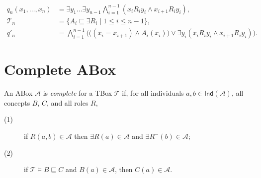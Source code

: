\documentclass{article}
\begin{document}
\begin{align*}
q_n(x_1, \ldots, x_n) &= \exists y_1 \ldots \exists y_{n-1} \bigwedge_{i=1}^{n-1} (x_i R_i y_i \land x_{i+1} R_i y_i),\\
%
\mathcal{T}_n &= \{A_i \sqsubseteq \exists R_i \mid 1 \le i \le n-1 \},\\
%
q'_n &= \bigwedge_{i = 1}^{n-1} \Big(\big( (x_i = x_{i+1}) \land A_i(x_i) \big)\lor 
\exists y_i (x_i R_i y_i \land x_{i+1} R_i y_i) \Big).
\end{align*}






\section{Complete ABox}

An ABox $\mathcal{A}$ is \emph{complete} for a TBox $\mathcal{T}$ if, for all individuals $a,b \in \mathsf{Ind}(\mathcal{A})$, all concepts $B$, $C$, and all roles $R$,
%
\begin{description}
\item[(1)] if $R(a,b) \in \mathcal{A}$ then $\exists R (a) \in \mathcal{A}$ and $\exists R^-(b) \in \mathcal{A}$;

\item[(2)] if $\mathcal{T} \models B \sqsubseteq C$ and $B(a) \in \mathcal{A}$, then $C(a) \in \mathcal{A}$.
\end{description}
\end{document}
